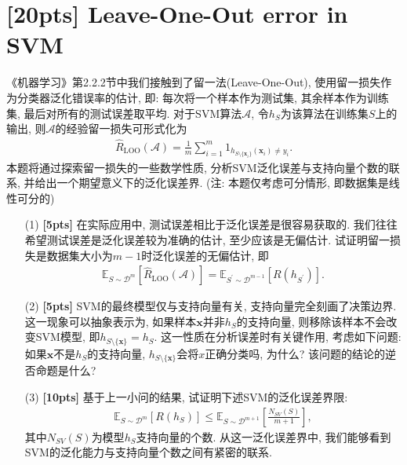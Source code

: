 \documentclass[a4paper,UTF8]{article}
\numberwithin{equation}{section}
\theoremstyle{definition}
\def \x {\boldsymbol{x}}
\begin{document}
\section{[20pts] Leave-One-Out error in SVM}
《机器学习》第2.2.2节中我们接触到了留一法(Leave-One-Out), 使用留一损失作为分类器泛化错误率的估计, 即: 每次将一个样本作为测试集, 其余样本作为训练集, 最后对所有的测试误差取平均. 对于SVM算法$\mathcal{A}$, 令$h_{S}$为该算法在训练集$S$上的输出, 则$\mathcal{A}$的经验留一损失可形式化为
\begin{align*}
    \hat R_{\text{LOO}}(\mathcal{A}) = \frac1m \sum_{i=1}^m \mathrm{1}_{h_{S \setminus \{\x_i\}}(\x_i) \neq y_i}.
\end{align*}
本题将通过探索留一损失的一些数学性质, 分析SVM泛化误差与支持向量个数的联系, 并给出一个期望意义下的泛化误差界. (注: 本题仅考虑可分情形, 即数据集是线性可分的)
\begin{enumerate}
	\item[(1)] \textbf{[5pts]} 在实际应用中, 测试误差相比于泛化误差是很容易获取的. 我们往往希望测试误差是泛化误差较为准确的估计, 至少应该是无偏估计. 试证明留一损失是数据集大小为$m-1$时泛化误差的无偏估计, 即
	\begin{align*}
        \mathbb{E}_{S \sim \mathcal{D}^m}[\hat{R}_{\mathrm{LOO}}(\mathcal{A})]=\mathbb{E}_{S^{\prime} \sim \mathcal{D}^{m-1}}\left[R\left(h_{S^{\prime}}\right)\right].
    \end{align*}
	\item[(2)] \textbf{[5pts]} SVM的最终模型仅与支持向量有关, 支持向量完全刻画了决策边界. 这一现象可以抽象表示为, 如果样本$\x$并非$h_S$的支持向量, 则移除该样本不会改变SVM模型, 即$h_{S \setminus \{\x\}} = h_S$. 这一性质在分析误差时有关键作用, 考虑如下问题:
	如果$\x$不是$h_S$的支持向量, $h_{S \setminus \{\x\}}$会将$x$正确分类吗, 为什么? 该问题的结论的逆否命题是什么? 
	\item[(3)] \textbf{[10pts]} 基于上一小问的结果, 试证明下述SVM的泛化误差界限:
	\begin{align*}
        \mathbb{E}_{S \sim \mathcal{D}^m}\left[R(h_S)\right] \leq \mathbb{E}_{S \sim \mathcal{D}^{m+1}} \left[\frac{N_{SV}(S)}{m+1}\right],
    \end{align*}
    其中$N_{SV}(S)$为模型$h_S$支持向量的个数. 从这一泛化误差界中, 我们能够看到SVM的泛化能力与支持向量个数之间有紧密的联系.

\end{enumerate}
\end{document}
